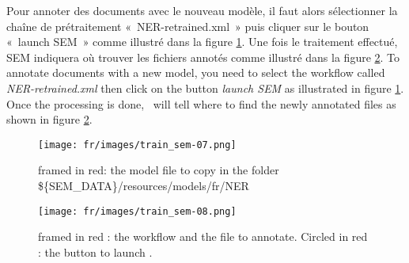 \documentclass[manual-fr.tex]{subfiles}
\begin{document}
Pour annoter des documents avec le nouveau modèle, il faut alors sélectionner la chaîne de prétraitement «~NER-retrained.xml~» puis cliquer sur le bouton «~launch SEM~» comme illustré dans la figure \ref{fig:train_sem-07}. Une fois le traitement effectué, SEM indiquera où trouver les fichiers annotés comme illustré dans la figure \ref{fig:train_sem-08}.
To annotate documents with a new model, you need to select the workflow called \emph{NER-retrained.xml} then click on the button \emph{launch SEM} as illustrated in figure \ref{fig:train_sem-07}. Once the processing is done, \SEM\ will tell where to find the newly annotated files as shown in figure \ref{fig:train_sem-08}.

\begin{figure}[ht!]
    \begin{center}
    \texttt{[image: fr/images/train\_sem-07.png]}
    \end{center}
    \caption{framed in red: the model file to copy in the folder \$\{SEM\_DATA\}/resources/models/fr/NER}
    \label{fig:train_sem-07}
\end{figure}

\begin{figure}[ht!]
    \begin{center}
    \texttt{[image: fr/images/train\_sem-08.png]}
    \end{center}
    \caption{framed in red : the workflow and the file to annotate. Circled in red : the button to launch \SEM.}
    \label{fig:train_sem-08}
\end{figure}
\end{document}
